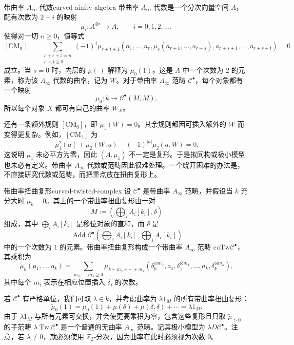 \begin{definition}{带曲率 $A_\infty$ 代数}{curved-ainfty-algebra}
带曲率 $A_\infty$ 代数是一个分次向量空间 $A$，配有次数为 $2-i$ 的映射
\[
  \mu_i\colon A^{\otimes i}\to A,\qquad i=0,1,2,\ldots,
\]
使得对一切 $n\geq0$，恒等式
\[
  [\mathrm{CM}_n]\qquad
  \sum_{\substack{r+s+t=n\\r,s,t\geq0}}
  (-1)^\dagger\mu_{r+t+1}
  (a_1,\ldots,a_r,\mu_s(a_{r+1},\ldots,a_{r+s}),
  a_{r+s+1},\ldots,a_{r+s+t})=0
\]
成立。当 $s=0$ 时，内层的 $\mu(\,)$ 解释为 $\mu_0(1)$。这是 $A$ 中一个次数为 $2$ 的元素，称为该 $A_\infty$ 代数的曲率，记为 $W$。对于带曲率 $A_\infty$ 范畴 $\mathcal C^\bullet$，每个对象都有一个映射
\[
  \mu_0\colon k\to\mathcal C^\bullet(M,M),
\]
所以每个对象 $X$ 都可有自己的曲率 $W_X$。
\end{definition}

\begin{note}\label{note:curvature-identities}
还有一条额外规则 $[\mathrm{CM}_0]$，即 $\mu_1(W)=0$。其余规则都因可插入额外的 $W$ 而变得更复杂。例如，$[\mathrm{CM}_1]$ 为
\[
  \mu_1^2(a)+\mu_2(W,a)-(-1)^{|a|}\mu_2(a,W)=0.
\]
这说明 $\mu_1$ 未必平方为零，因此 $(A,\mu_1)$ 不一定是复形。于是拟同构或极小模型也未必有定义。带曲率 $A_\infty$ 代数或范畴因此很难处理。一个绕开困难的办法是，不直接研究代数或范畴，而把重点放在扭曲复形上。
\end{note}

\begin{definition}{带曲率扭曲复形}{curved-twisted-complex}
设 $\mathcal C^\bullet$ 是带曲率 $A_\infty$ 范畴，并假设当 $k$ 充分大时 $\mu_k=0$。其上的一个带曲率扭曲复形由一对
\[
  M:=\left(\bigoplus_i A_i[k_i],\delta\right)
\]
组成，其中 $\bigoplus_i A_i[k_i]$ 是移位对象的直和，而 $\delta$ 是
\[
  \operatorname{Add}\mathcal C^\bullet
  \left(\bigoplus_iA_i[k_i],\bigoplus_iA_i[k_i]\right)
\]
中的一个次数为 $1$ 的元素。带曲率扭曲复形构成一个带曲率 $A_\infty$ 范畴 $\mathrm{cuTw}\mathcal C^\bullet$，其乘积为
\[
  \widetilde\mu_k(a_1,\ldots,a_k)
  =\sum_{m_0,\ldots,m_k\geq0}
  \mu_{k+m_0+\cdots+m_k}
  (\delta_0^{\otimes m_0},a_1,\delta_1^{\otimes m_1},\ldots,
  a_k,\delta_k^{\otimes m_k}),
\]
其中每个 $m_i$ 表示在相应位置插入 $\delta_i$ 的次数。

若 $\mathcal C^\bullet$ 有严格单位，我们可取 $\lambda\in k$，并考虑曲率为 $\lambda 1_M$ 的所有带曲率扭曲复形：
\[
  \widetilde\mu_0(1)=\mu_0(1)+\mu(\delta)+\mu(\delta,\delta)+\cdots
  =\lambda 1_M.
\]
由于 $\lambda1_M$ 与所有元素可交换，并会使更高乘积为零，包含这些复形且只取 $\widetilde\mu_{>0}$ 的子范畴 $\lambda\operatorname{Tw}\mathcal C^\bullet$ 是一个普通的无曲率 $A_\infty$ 范畴。记其极小模型为 $\lambda D\mathcal C^\bullet$。注意，若 $\lambda\ne0$，就必须使用 $\mathbb Z_2$-分次，因为曲率在此时必须视为次数 $0$。
\end{definition}

